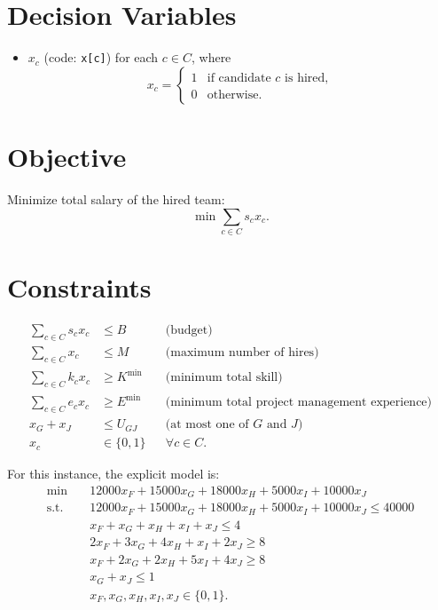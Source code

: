 \section*{Decision Variables}

\begin{itemize}
    \item $x_c$ (code: \texttt{x[c]}) for each $c \in C$, where
    \[
    x_c=
    \begin{cases}
    1 & \text{if candidate } c \text{ is hired},\\
    0 & \text{otherwise.}
    \end{cases}
    \]
\end{itemize}

\section*{Objective}

Minimize total salary of the hired team:
\[
\min \sum_{c \in C} s_c x_c.
\]

\section*{Constraints}

\begin{align}
\sum_{c \in C} s_c x_c &\le B
&& \text{(budget)} \\
\sum_{c \in C} x_c &\le M
&& \text{(maximum number of hires)} \\
\sum_{c \in C} k_c x_c &\ge K^{\min}
&& \text{(minimum total skill)} \\
\sum_{c \in C} e_c x_c &\ge E^{\min}
&& \text{(minimum total project management experience)} \\
x_G + x_J &\le U_{GJ}
&& \text{(at most one of $G$ and $J$)} \\
x_c &\in \{0,1\}
&& \forall c \in C.
\end{align}

For this instance, the explicit model is:
\begin{align}
\min\quad &12000x_F+15000x_G+18000x_H+5000x_I+10000x_J \\
\text{s.t.}\quad
&12000x_F+15000x_G+18000x_H+5000x_I+10000x_J \le 40000 \\
&x_F+x_G+x_H+x_I+x_J \le 4 \\
&2x_F+3x_G+4x_H+x_I+2x_J \ge 8 \\
&x_F+2x_G+2x_H+5x_I+4x_J \ge 8 \\
&x_G+x_J \le 1 \\
&x_F,x_G,x_H,x_I,x_J \in \{0,1\}.
\end{align}

